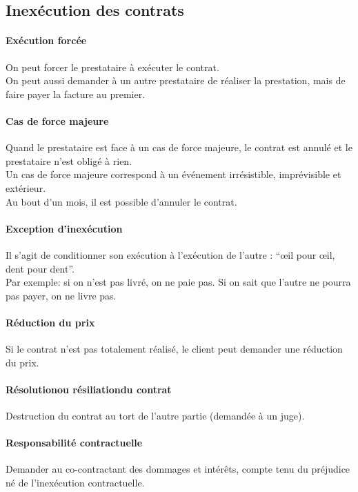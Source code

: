 \documentclass[10pt,a4paper,french]{article}
\begin{document}
\subsection{Inexécution des contrats}

\paragraph{Exécution forcée}
On peut forcer le prestataire à exécuter le contrat. \\
On peut aussi demander à un autre prestataire de réaliser la prestation, mais de faire payer la facture au premier.

\paragraph{Cas de force majeure}
Quand le prestataire est face à un cas de force majeure, le contrat est annulé et le prestataire n'est obligé à rien. \\
Un cas de force majeure correspond à un événement irrésistible, imprévisible et extérieur. \\
Au bout d'un mois, il est possible d'annuler le contrat.

\paragraph{Exception d'inexécution}
Il s'agit de conditionner son exécution à l'exécution de l'autre : ``œil pour œil, dent pour dent''. \\
Par exemple: si on n'est pas livré, on ne paie pas. Si on sait que l'autre ne pourra pas payer, on ne livre pas.

\paragraph{Réduction du prix}
Si le contrat n'est pas totalement réalisé, le client peut demander une réduction du prix.

\paragraph{Résolutionou résiliationdu contrat}
Destruction du contrat au tort de l'autre partie (demandée à un juge).

\paragraph{Responsabilité contractuelle}
Demander au co-contractant des dommages et intérêts, compte tenu du préjudice né de l'inexécution contractuelle.
\end{document}
